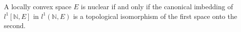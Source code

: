 A locally convex space $E$ is nuclear if and only if the canonical imbedding of $l^1[\mathbb{N}, E]$ in $l^1(\mathbb{N}, E)$ is a topological isomorphism of the first space onto the second.
